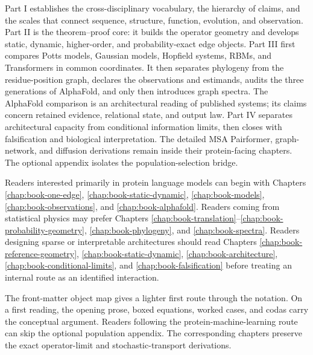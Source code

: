 Part I establishes the cross-disciplinary vocabulary, the hierarchy of claims, and the scales that
connect sequence, structure, function, evolution, and observation.  Part II is the theorem--proof
core: it builds the operator geometry and develops static, dynamic, higher-order, and
probability-exact edge objects.  Part III first compares Potts models, Gaussian models, Hopfield
systems, RBMs, and Transformers in common coordinates.  It then separates phylogeny from the
residue-position graph, declares the observations and estimands, audits the three generations of
AlphaFold, and only then introduces graph spectra.  The AlphaFold comparison is an architectural
reading of published systems; its claims concern retained evidence, relational state, and output
law.  Part IV separates architectural capacity from conditional information limits, then closes
with falsification and biological interpretation.  The detailed MSA Pairformer, graph-network, and
diffusion derivations remain inside their protein-facing chapters.  The optional appendix isolates
the population-selection bridge.

Readers interested primarily in protein language models can begin with Chapters
\ref{chap:book-one-edge}, \ref{chap:book-static-dynamic}, \ref{chap:book-models},
\ref{chap:book-observations}, and \ref{chap:book-alphafold}.  Readers coming from statistical
physics may prefer Chapters \ref{chap:book-translation}--\ref{chap:book-probability-geometry},
\ref{chap:book-phylogeny}, and \ref{chap:book-spectra}.  Readers designing sparse or interpretable architectures should read
Chapters \ref{chap:book-reference-geometry}, \ref{chap:book-static-dynamic},
\ref{chap:book-architecture}, \ref{chap:book-conditional-limits}, and
\ref{chap:book-falsification} before treating an internal route as an identified interaction.

The front-matter object map gives a lighter first route through the notation.  On a first reading,
the opening prose, boxed equations, worked cases, and codas carry the conceptual argument.  Readers
following the protein-machine-learning route can skip the optional population appendix.  The
corresponding chapters preserve the exact operator-limit and stochastic-transport derivations.

